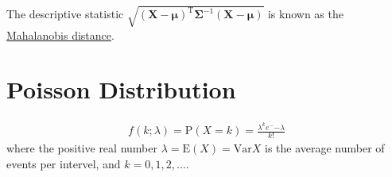\documentclass[../statistics.tex]{subfiles}
\begin{document}
The descriptive statistic $\sqrt{{(\mathbf{X} - \boldsymbol\mu)}^{\text{T}} \boldsymbol\Sigma^{-1} (\mathbf{X} - \boldsymbol\mu)}$
is known as the \href{https://en.wikipedia.org/wiki/Mahalanobis_distance}{Mahalanobis distance}.


\chapter{Poisson Distribution}%
\label{sec:poisson}
\begin{align}
  \label{eq:poisson}
  f(k; \lambda) = \text{P}(X = k) = \frac{\lambda^k e^-{-\lambda}}{k!} 
\end{align}
%
where the positive real number $\lambda = \text{E}(X) = \text{Var}{X}$ is the
average number of events per intervel, and $k = 0, 1, 2, \ldots$.
\end{document}

